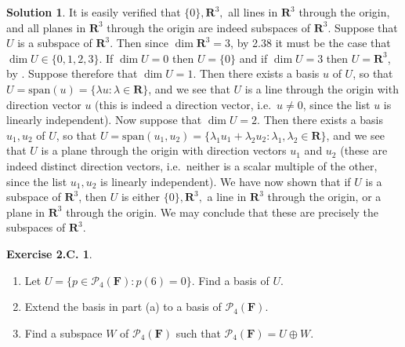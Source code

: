 \documentclass[12pt]{article}
\theoremstyle{definition}
\theoremstyle{exercise}
\newtheorem{exercise}{Exercise 2.C.}
\theoremstyle{solution}
\newtheorem*{solution}{Solution}
\newcommand{\poly}{\mathcal{P}}
\newcommand{\Span}{\text{span}}
\newcommand{\R}{\mathbf{R}}
\newcommand{\F}{\mathbf{F}}
\begin{document}
\begin{solution}
    It is easily verified that \( \{ 0 \}, \R^3, \) all lines in \( \R^3 \) through the origin, and all planes in \( \R^3 \) through the origin are indeed subspaces of \( \R^3 \). Suppose that \( U \) is a subspace of \( \R^3 \). Then since \( \dim \R^3 = 3 \), by 2.38 it must be the case that \( \dim U \in \{ 0, 1, 2, 3 \} \). If \( \dim U = 0 \) then \( U = \{ 0 \} \) and if \( \dim U = 3 \) then \( U = \R^3 \), by . Suppose therefore that \( \dim U = 1 \). Then there exists a basis \( u \) of \( U \), so that \( U = \Span(u) = \{ \lambda u : \lambda \in \R \} \), and we see that \( U \) is a line through the origin with direction vector \( u \) (this is indeed a direction vector, i.e.\ \( u \neq 0 \), since the list \( u \) is linearly independent). Now suppose that \( \dim U = 2 \). Then there exists a basis \( u_1, u_2 \) of \( U \), so that \( U = \Span(u_1, u_2) = \{ \lambda_1 u_1 + \lambda_2 u_2 : \lambda_1, \lambda_2 \in \R \} \), and we see that \( U \) is a plane through the origin with direction vectors \( u_1 \) and \( u_2 \) (these are indeed distinct direction vectors, i.e.\ neither is a scalar multiple of the other, since the list \( u_1, u_2 \) is linearly independent). We have now shown that if \( U \) is a subspace of \( \R^3 \), then \( U \) is either \( \{ 0 \}, \R^3, \) a line in \( \R^3 \) through the origin, or a plane in \( \R^3 \) through the origin. We may conclude that these are precisely the subspaces of \( \R^3 \).
\end{solution}

\begin{exercise}
\label{ex:4}
    \begin{enumerate}
        \item Let \( U = \{ p \in \poly_4(\F) : p(6) = 0 \} \). Find a basis of \( U \).

        \item Extend the basis in part (a) to a basis of \( \poly_4(\F) \).

        \item Find a subspace \( W \) of \( \poly_4(\F) \) such that \( \poly_4(\F) = U \oplus W \).
    \end{enumerate}
\end{exercise}
\end{document}
